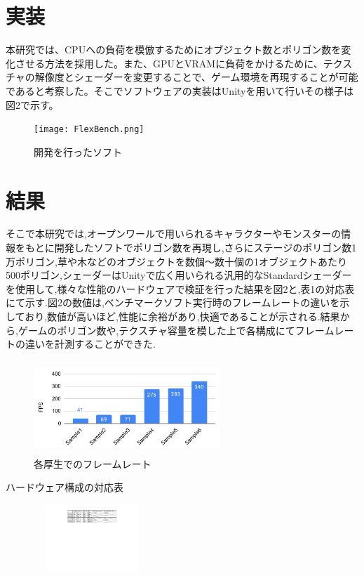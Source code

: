\documentclass[twocolumn,10pt,a4j]{ltjsarticle}
\begin{document}
\section{実装}
本研究では、CPUへの負荷を模倣するためにオブジェクト数とポリゴン数を変化させる方法を採用した。また、GPUとVRAMに負荷をかけるために、テクスチャの解像度とシェーダーを変更することで、ゲーム環境を再現することが可能であると考察した。そこでソフトウェアの実装はUnityを用いて行いその様子は図2で示す。

\vspace{2mm}
\begin{figure}[H]
\begin{center}
 \texttt{[image: FlexBench.png]}
\end{center}
 \caption{開発を行ったソフト}
 \label{fig:図1}
\end{figure}

\section{結果}
そこで本研究では,オープンワールで用いられるキャラクターやモンスターの情報をもとに開発したソフトでポリゴン数を再現し,さらにステージのポリゴン数1万ポリゴン,草や木などのオブジェクトを数個～数十個の1オブジェクトあたり500ポリゴン,シェーダーはUnityで広く用いられる汎用的なStandardシェーダーを使用して,様々な性能のハードウェアで検証を行った結果を図2と,表1の対応表にて示す.図2の数値は,ベンチマークソフト実行時のフレームレートの違いを示しており,数値が高いほど,性能に余裕があり,快適であることが示される.結果から,ゲームのポリゴン数や,テクスチャ容量を模した上で各構成にてフレームレートの違いを計測することができた.

\vspace{5mm}
\begin{figure}[H]
\begin{center}
 \includegraphics[clip,width=70mm,height=35mm]{グラフ.pdf}
\end{center}
 \caption{各厚生でのフレームレート}
 \label{fig:図1}
\end{figure}

\vspace{5mm}
\begin{table}[H]
\begin{center}
\caption{ハードウェア構成の対応表}
\vspace{2mm}
 \label{fig:教科書}
 \includegraphics[clip,width=65mm,height=25mm]{対応表.pdf}
\end{center}
\end{table}
\end{document}
